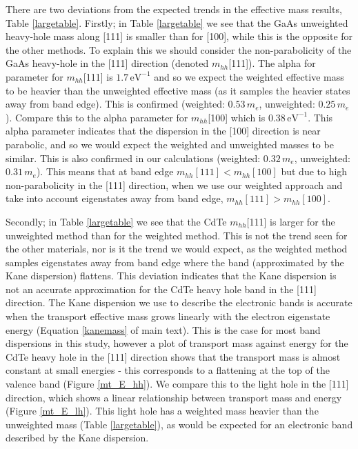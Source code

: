 There are two deviations from the expected trends in the effective mass results, Table \ref{largetable}. 
Firstly; in Table \ref{largetable} we see that the GaAs unweighted heavy-hole mass along [111] is smaller than for [100], while this is the opposite for the other methods. To explain this we should consider the non-parabolicity of the GaAs heavy-hole in the [111] direction (denoted $m_{hh}$[111]). The alpha for parameter for $m_{hh}$[111] is $1.7\,\mathrm{eV}^{-1}$ and so we expect the weighted effective mass to be heavier than the unweighted effective mass (as it samples the heavier states away from band edge). This is confirmed (weighted: $0.53\,m_e$, unweighted: $0.25\,m_e$). Compare this to the alpha parameter for $m_{hh}$[100] which is $0.38\,\mathrm{eV}^{-1}$. This alpha parameter indicates that the dispersion in the [100] direction is near parabolic, and so we would expect the weighted and unweighted masses to be similar. This is also confirmed in our calculations (weighted: $0.32\,m_e$, unweighted: $0.31\,m_e$).
This means that at band edge $m_{hh}\mathrm{[111]} < m_{hh}\mathrm{[100]}$ but due to high non-parabolicity in the [111] direction, when we use our weighted approach and take into account eigenstates away from band edge, $m_{hh}\mathrm{[111]} > m_{hh}\mathrm{[100]}$.

Secondly; in Table \ref{largetable} we see that the CdTe $m_{hh}$[111] is larger for the unweighted method than for the weighted method. This is not the trend seen for the other materials, nor is it the trend we would expect, as the weighted method samples eigenstates away from band edge where the band (approximated by the Kane dispersion) flattens.
This deviation indicates that the Kane dispersion is not an accurate approximation for the CdTe heavy hole band in the [111] direction. The Kane dispersion we use to describe the electronic bands is accurate when the transport effective mass grows linearly with the electron eigenstate energy (Equation \ref{kanemass} of main text). This is the case for most band dispersions in this study, however a plot of transport mass against energy for the CdTe heavy hole in the [111] direction shows that the transport mass is almost constant at small energies - this corresponds to a flattening at the top of the valence band (Figure \ref{mt_E_hh}). We compare this to the light hole in the [111] direction, which shows a linear relationship between transport mass and energy (Figure \ref{mt_E_lh}). This light hole has a weighted mass heavier than the unweighted mass (Table \ref{largetable}), as would be expected for an electronic band described by the Kane dispersion.

